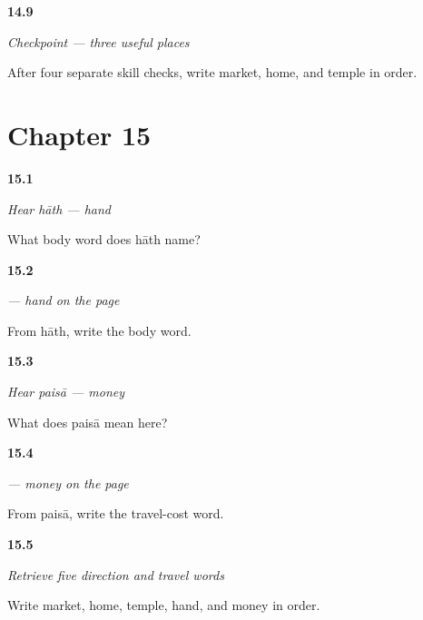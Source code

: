 \noindent\begin{minipage}[t]{\linewidth}
\raggedright
\hypertarget{review-MW-R10-places-three-payoff}{\textbf{14.9}} \emph{Checkpoint — three useful places}\par
\small After four separate skill checks, write market, home, and temple in order.
\end{minipage}\par\medskip

\section*{Chapter 15}

\noindent\begin{minipage}[t]{\linewidth}
\raggedright
\hypertarget{review-MW-C10-hear-haath-meaning}{\textbf{15.1}} \emph{Hear \emph{hāth} — hand}\par
\small What body word does hāth name?
\end{minipage}\par\medskip

\noindent\begin{minipage}[t]{\linewidth}
\raggedright
\hypertarget{review-MW-C10-haath-dictation}{\textbf{15.2}} \emph{ — hand on the page}\par
\small From hāth, write the body word.
\end{minipage}\par\medskip

\noindent\begin{minipage}[t]{\linewidth}
\raggedright
\hypertarget{review-MW-C10-hear-paisa-meaning}{\textbf{15.3}} \emph{Hear \emph{paisā} — money}\par
\small What does paisā mean here?
\end{minipage}\par\medskip

\noindent\begin{minipage}[t]{\linewidth}
\raggedright
\hypertarget{review-MW-C10-paisa-dictation}{\textbf{15.4}} \emph{ — money on the page}\par
\small From paisā, write the travel-cost word.
\end{minipage}\par\medskip

\noindent\begin{minipage}[t]{\linewidth}
\raggedright
\hypertarget{review-MW-R10-travel-five-recall}{\textbf{15.5}} \emph{Retrieve five direction and travel words}\par
\small Write market, home, temple, hand, and money in order.
\end{minipage}\par\medskip

